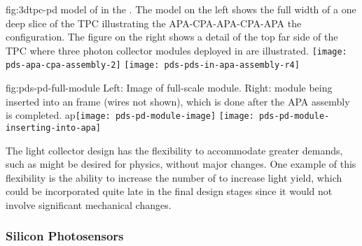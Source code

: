 


\begin{dunefigure}{fig:3dtpc-pd}
{\threed model of  in the . The model on the left shows the full width of a one  deep slice of the TPC illustrating the APA-CPA-APA-CPA-APA the configuration. The figure on the right shows a detail of the top far side of the TPC where three photon collector modules deployed in  are illustrated.}
\texttt{[image: pds-apa-cpa-assembly-2]}
\texttt{[image: pds-pds-in-apa-assembly-r4]}
\end{dunefigure}

\begin{dunefigure}{fig:pds-pd-full-module}
{Left: Image of full-scale  module.  Right:  module being inserted into an  frame (wires not shown), which is done after the APA assembly is completed.}
ap\texttt{[image: pds-pd-module-image]}
\hspace{0.01\textwidth}
\texttt{[image: pds-pd-module-inserting-into-apa]}
\end{dunefigure}


The  light collector design has the flexibility to accommodate greater demands, such as might be desired for  physics, without major changes. One example of this flexibility is the ability to increase the number of  to increase light yield, which could be incorporated quite late in the final design stages since it would not involve significant mechanical changes.

\subsubsection{Silicon Photosensors} 
\label{sssec:photosensors}

